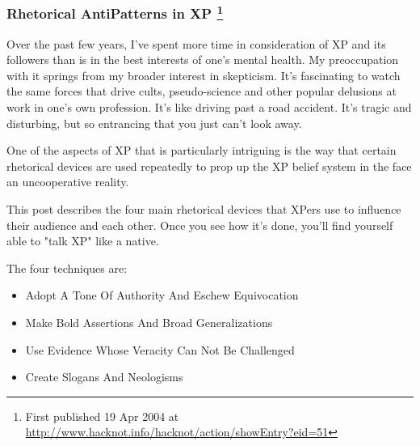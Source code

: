 \documentclass{article}
\begin{document}
\subsubsection{Rhetorical AntiPatterns in XP  \footnote{First published 19 Apr 2004 at
\url{http://www.hacknot.info/hacknot/action/showEntry?eid=51}}}
\label{sec:orgheadline210}

Over the past few years, I've spent more time in consideration of XP and
its followers than is in the best interests of one's mental health. My
preoccupation with it springs from my broader interest in skepticism.
It's fascinating to watch the same forces that drive cults,
pseudo-science and other popular delusions at work in one's own
profession. It's like driving past a road accident. It's tragic and
disturbing, but so entrancing that you just can't look away.

One of the aspects of XP that is particularly intriguing is the way that
certain rhetorical devices are used repeatedly to prop up the XP belief
system in the face an uncooperative reality.

This post describes the four main rhetorical devices that XPers use to
influence their audience and each other. Once you see how it's done,
you'll find yourself able to "talk XP" like a native.

The four techniques are:

\begin{itemize}
\item Adopt A Tone Of Authority And Eschew Equivocation
\item Make Bold Assertions And Broad Generalizations
\item Use Evidence Whose Veracity Can Not Be Challenged
\item Create Slogans And Neologisms
\end{itemize}
\end{document}
